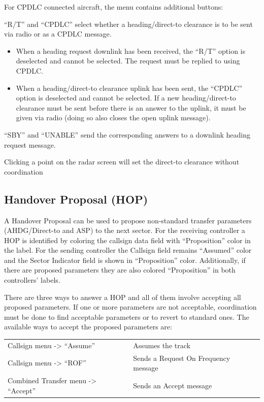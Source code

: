 \documentclass[11pt,a4paper,oldfontcommands]{memoir}
\newenvironment{Warn}
  {\begin{shaded}\marginnote{\fbox{Warning}}}
  {\end{shaded}}
\begin{document}
For CPDLC connected aircraft, the menu contains additional buttons:

“R/T” and “CPDLC” select whether a heading/direct-to clearance is to be sent via radio
or as a CPDLC message.
\begin{itemize}
        \item When a heading request downlink has been received, the “R/T” option is deselected
    and cannot be selected. The request must be replied to using CPDLC.
        \item When a heading/direct-to clearance uplink has been sent, the “CPDLC” option is
deselected and cannot be selected. If a new heading/direct-to clearance must be sent
before there is an answer to the uplink, it must be given via radio (doing so also closes
the open uplink message).
\end{itemize}

“SBY” and “UNABLE” send the corresponding answers to a downlink heading request
message.

\begin{Warn}
Clicking a point on the radar screen will set the direct-to clearance without coordination 
\end{Warn}

\subsection{Handover Proposal (HOP)}
\label{win:hop}
A Handover Proposal can be used to propose non-standard transfer parameters (AHDG/Direct-to and ASP)
to the next sector. For the receiving controller a HOP is identified by coloring the callsign data field with
“Proposition” color in the label. For the sending controller the Callsign field remains “Assumed” color and
the Sector Indicator field is shown in “Proposition” color. Additionally, if there are proposed parameters
they are also colored “Proposition” in both controllers’ labels.

There are three ways to answer a HOP and all of them involve accepting all proposed parameters. If one or
more parameters are not acceptable, coordination must be done to find acceptable parameters or to revert
to standard ones. The available ways to accept the proposed parameters are:

\begin{tabular}{l l}
Callsign menu -> “Assume”               & Assumes the track
\\Callsign menu -> “ROF”                & Sends a Request On Frequency message
\\Combined Transfer menu -> “Accept”    &  Sends an Accept message
\end{tabular}
\end{document}
